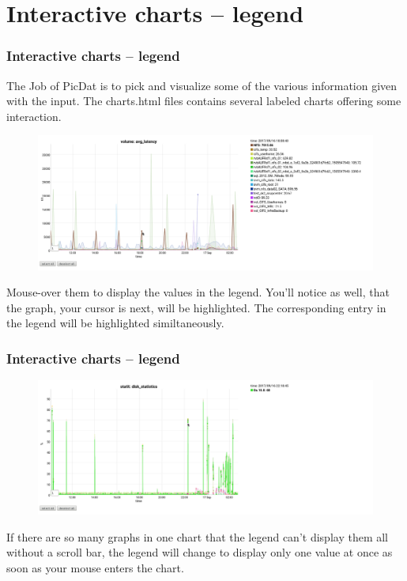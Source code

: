 \documentclass[8pt]{beamer}
\begin{document}
\section{Interactive charts -- legend}
\begin{frame}
\frametitle{Interactive charts -- legend}
The Job of PicDat is to pick and visualize some of the various information given with the input. The charts.html files contains several labeled charts offering some interaction. 

\begin{figure}
	\includegraphics[width=\textwidth]{../images/PicDat_highlight2.png}
\end{figure}

Mouse-over them to display the values in the legend. You'll notice as well, that the graph, your cursor is next, will be highlighted. The corresponding entry in the legend will be highlighted similtaneously.
\end{frame}

\begin{frame}
\frametitle{Interactive charts -- legend} 
\begin{figure}
	\includegraphics[width=\textwidth]{../images/PicDat_singleValue.png}
\end{figure}

If there are so many graphs in one chart that the legend can't display them all without a scroll bar, the legend will change to display only one value at once as soon as your mouse enters the chart.
\end{frame}
\end{document}
